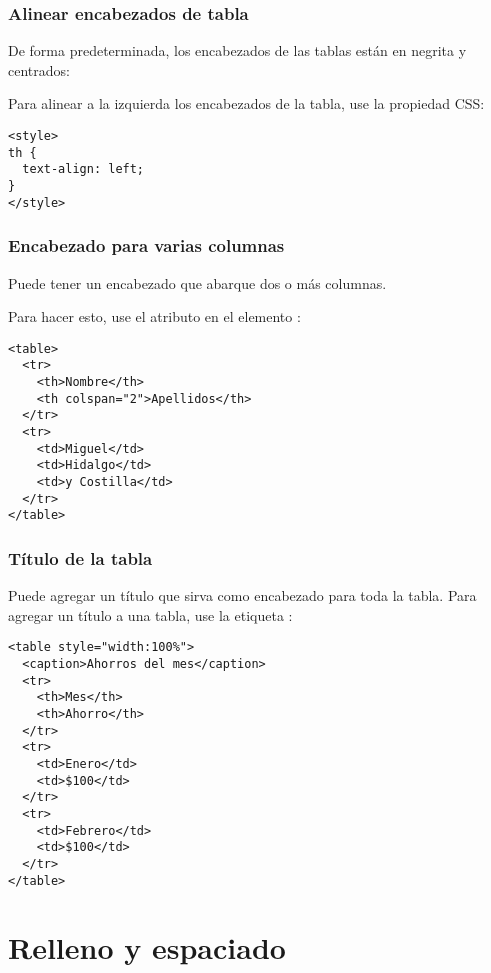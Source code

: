 \begin{frame}[fragile]
  \frametitle{Alinear encabezados de tabla}

  De forma predeterminada, los encabezados de las tablas están
  en negrita y centrados:

  Para alinear a la izquierda los encabezados de la tabla,
  use la propiedad  CSS:

  \vspace{\baselineskip}
  \begin{lstlisting}
<style>
th {
  text-align: left;
}
</style>
  \end{lstlisting}
\end{frame}

\begin{frame}[fragile]
  \frametitle{Encabezado para varias columnas}

  Puede tener un encabezado que abarque dos o más columnas.

  Para hacer esto, use el atributo  en el elemento
  :

  \vspace{\baselineskip}
  \begin{lstlisting}
<table>
  <tr>
    <th>Nombre</th>
    <th colspan="2">Apellidos</th>
  </tr>
  <tr>
    <td>Miguel</td>
    <td>Hidalgo</td>
    <td>y Costilla</td>
  </tr>
</table> 
  \end{lstlisting}
\end{frame}

\begin{frame}[fragile]
  \frametitle{Título de la tabla}

  Puede agregar un título que sirva como encabezado para toda la tabla.
  Para agregar un título a una tabla, use la etiqueta :

  \vspace{\baselineskip}
  \begin{lstlisting}
<table style="width:100%">
  <caption>Ahorros del mes</caption>
  <tr>
    <th>Mes</th>
    <th>Ahorro</th>
  </tr>
  <tr>
    <td>Enero</td>
    <td>$100</td>
  </tr>
  <tr>
    <td>Febrero</td>
    <td>$100</td>
  </tr>
</table> 
  \end{lstlisting}
\end{frame}

\section{Relleno y espaciado}

